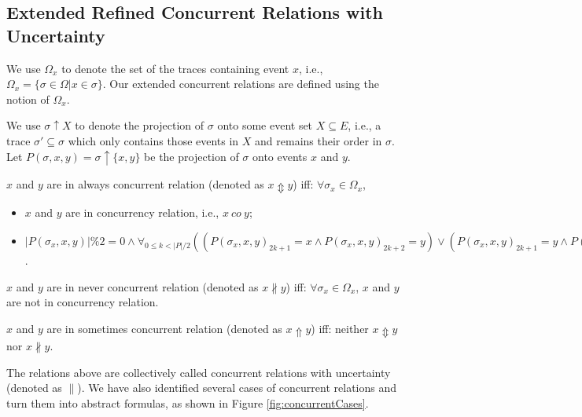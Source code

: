 \documentclass{llncs}
\begin{document}
\subsection{Extended Refined Concurrent Relations with Uncertainty}\label{subsec:concurrent}
We use $\Omega_{x}$ to denote the set of the traces containing event $x$, i.e., $\Omega_{x}=\{\sigma\in\Omega|x\in\sigma\}$. Our extended concurrent relations are defined using the notion of $\Omega_{x}$.

We use $\sigma\uparrow X$ to denote the projection of $\sigma$ onto some event set $X\subseteq E$, i.e., a trace $\sigma'\subseteq\sigma$ which only contains those events in $X$ and remains their order in $\sigma$. Let $P(\sigma,x,y)=\sigma\uparrow\{x,y\}$ be the projection of $\sigma$ onto events $x$ and $y$.

\begin{definition}\label{def:alwaysConcurrent}
$x$ and $y$ are in always concurrent relation (denoted as $x\Updownarrow y$) iff: $\forall\sigma_{x}\in\Omega_{x}$,
	\begin{itemize}
		\item[-] $x$ and $y$ are in concurrency relation, i.e., $x~co~y$;
		\item[-] $|P(\sigma_{x},x,y)|\%2=0\wedge\forall_{0\leq k<|P|/2}((P(\sigma_{x},x,y)_{2k+1}=x\wedge P(\sigma_{x},x,y)_{2k+2}=y)\vee(P(\sigma_{x},x,y)_{2k+1}=y\wedge P(\sigma_{x},x,y)_{2k+2}=x)\vee(P(\sigma_{x},x,y)_{2k+1}=y\wedge P(\sigma_{x},x,y)_{2k+2}=y))$.
	\end{itemize}
\end{definition}

\begin{definition}\label{def:neverConcurrent}
$x$ and $y$ are in never concurrent relation (denoted as $x\nparallel y$) iff: $\forall\sigma_{x}\in\Omega_{x}$, $x$ and $y$ are not in concurrency relation.
\end{definition}

\begin{definition}\label{def:sometimesConcurrent}
$x$ and $y$ are in sometimes concurrent relation (denoted as $x\Uparrow y$) iff: neither $x\Updownarrow y$ nor $x\nparallel y$.
\end{definition}

The relations above are collectively called concurrent relations with uncertainty (denoted as $\parallel$). We have also identified several cases of concurrent relations and turn them into abstract formulas, as shown in Figure \ref{fig:concurrentCases}.
\end{document}
